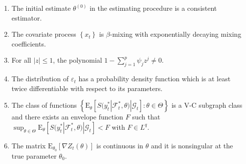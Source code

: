 \documentclass[a4paper,12pt]{article}
\newcommand{\E}{\mathop{\mathbb{E}}}
\def \E{\mbox{E}}
\def \F {\mathcal{F}}
\def \G {\mathcal{G}}
\begin{document}
\begin{enumerate}
  \item \label{ass:init} The initial estimate $\theta^{(0)}$ in the estimating procedure is a consistent estimator.
\item \label{ass:xMixing} The covariate process $\left\{ x_t \right\}$ is $\beta$-mixing with exponentially decaying mixing coefficients.
\item \label{ass:root} For all $|z| \le 1$, the polynomial $1-\sum_{j=1}^p\psi_j z^j \ne 0 $.
\item \label{ass:innoDis} The distribution of $\varepsilon_t$ has a probability density function which is at least twice differentiable with respect to its parameters.
\item \label{ass:innoDis2} The class of functions $\left\{ \E_\theta\left[S(y_t^*|\F_t^*,\theta) | \G_t\right] :\theta \in \Theta\right\}$ is a V-C subgraph class and there exists an envelope function $F$ such that $\sup_{\theta\in\Theta}\E_\theta\left[S(y_t^*|\F_t^*,\theta) | \G_t\right]<F$ with $F\in L^{q}$.
\item \label{ass:nonsingular} The matrix $\E_{\theta_0}\left[ \nabla Z_t(\theta) \right]$ is continuous in $\theta$ and it is nonsingular	at the true parameter $\theta_0$.

    \end{enumerate}

\end{document}
